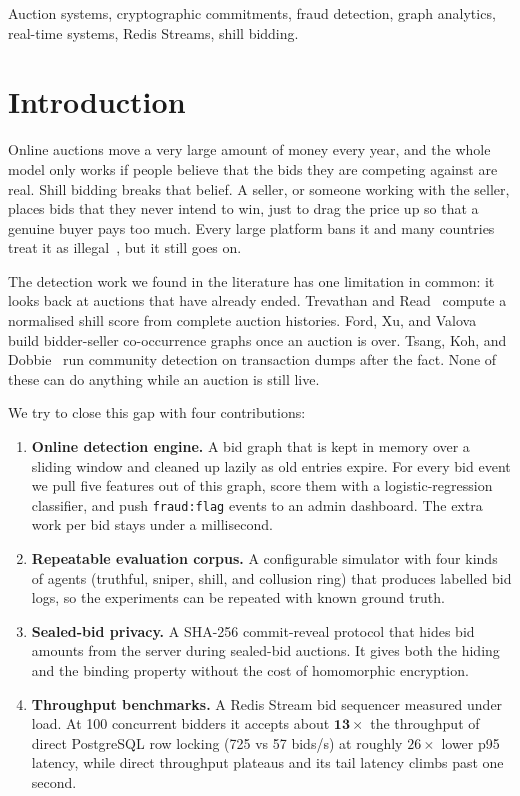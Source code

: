 \documentclass[conference]{IEEEtran}
\begin{document}
\begin{IEEEkeywords}
Auction systems, cryptographic commitments, fraud detection, graph
analytics, real-time systems, Redis Streams, shill bidding.
\end{IEEEkeywords}

\section{Introduction}

Online auctions move a very large amount of money every year, and the
whole model only works if people believe that the bids they are
competing against are real. Shill bidding breaks that belief. A seller,
or someone working with the seller, places bids that they never intend to
win, just to drag the price up so that a genuine buyer pays too much.
Every large platform bans it and many countries treat it as
illegal~\cite{Trevathan2007}, but it still goes on.

The detection work we found in the literature has one limitation in
common: it looks back at auctions that have already ended. Trevathan and
Read~\cite{Trevathan2007} compute a normalised shill score from complete
auction histories. Ford, Xu, and Valova~\cite{Ford2010} build
bidder-seller co-occurrence graphs once an auction is over. Tsang, Koh,
and Dobbie~\cite{Tsang2014} run community detection on transaction dumps
after the fact. None of these can do anything while an auction is still
live.

We try to close this gap with four contributions:

\begin{enumerate}
  \item \textbf{Online detection engine.} A bid graph that is kept in
    memory over a sliding window and cleaned up lazily as old entries
    expire. For every bid event we pull five features out of this graph,
    score them with a logistic-regression classifier, and push
    {\tt fraud:flag} events to an admin dashboard. The extra work per bid
    stays under a millisecond.

  \item \textbf{Repeatable evaluation corpus.} A configurable simulator
    with four kinds of agents (truthful, sniper, shill, and collusion
    ring) that produces labelled bid logs, so the experiments can be
    repeated with known ground truth.

  \item \textbf{Sealed-bid privacy.} A SHA-256 commit-reveal protocol
    that hides bid amounts from the server during sealed-bid auctions. It
    gives both the hiding and the binding property without the cost of
    homomorphic encryption.

  \item \textbf{Throughput benchmarks.} A Redis Stream bid sequencer
    measured under load. At 100 concurrent bidders it accepts about
    $\mathbf{13\times}$ the throughput of direct PostgreSQL row locking
    (725 vs 57 bids/s) at roughly $26\times$ lower p95 latency, while
    direct throughput plateaus and its tail latency climbs past one
    second.
\end{enumerate}
\end{document}
